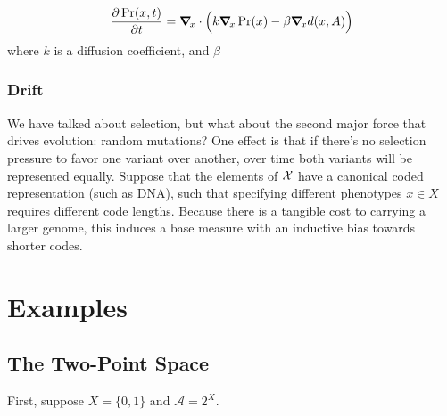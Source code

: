 \documentclass{article}
\begin{document}
\[
    \frac{\partial \Pr(x, t)}{\partial t} = \boldsymbol\nabla_{\!x} \cdot \Big( k \boldsymbol\nabla_{\!x} \Pr (x) - \beta \boldsymbol\nabla_{\!x} d(x, A) \Big)
\]
where $k$ is a diffusion coefficient, and $\beta$



\subsubsection{Drift}
We have talked about selection, but what about the second major force that drives evolution: random mutations?
One effect is that if there's no selection pressure to favor one variant over another, over time both variants will be represented equally.
Suppose that the elements of $\mathcal X$ have a canonical coded representation (such as DNA), such that specifying different phenotypes $x \in X$ requires different code lengths.
Because there is a tangible cost to carrying a larger genome, this induces a base measure with an inductive bias towards shorter codes.

%



\newpage%
\section{Examples}

\subsection{The Two-Point Space}
First, suppose $X = \{0,1\}$ and $\mathcal A = 2^X$.
\end{document}
